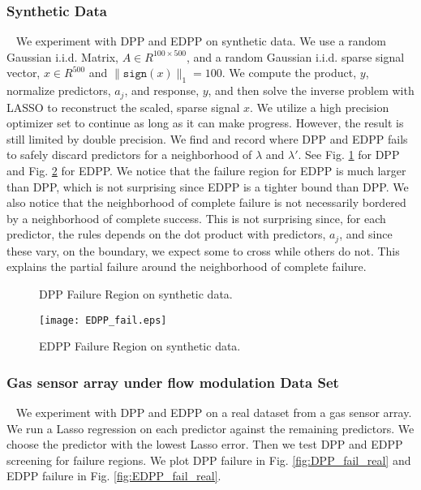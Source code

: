 \documentclass{article}
\begin{document}
\subsubsection*{Synthetic Data}

\qquad ~ We experiment with DPP and EDPP on synthetic data. We use a random Gaussian i.i.d. Matrix, $A\in R^{100 \times 500}$, and a random Gaussian i.i.d. sparse signal vector, $x\in R^{500}$ and $\|\texttt{sign}(x)\|_1=100$. We compute the product, $y$, normalize predictors, $a_j$, and response, $y$, and then solve the inverse problem with LASSO to reconstruct the scaled, sparse signal $x$. We utilize a high precision optimizer set to continue as long as it can make progress. However, the result is still limited by double precision. We find and record where DPP and EDPP fails to safely discard predictors for a neighborhood of $\lambda$ and $\lambda'$. See Fig. \ref{fig:DPP_fail} for DPP and Fig. \ref{fig:EDPP_fail} for EDPP. We notice that the failure region for EDPP is much larger than DPP, which is not surprising since EDPP is a tighter bound than DPP. We also notice that the neighborhood of complete failure is not necessarily bordered by a neighborhood of complete success. This is not surprising since, for each predictor, the rules depends on the dot product with predictors, $a_j$, and since these vary, on the boundary, we expect some to cross while others do not. This explains the partial failure around the neighborhood of complete failure. 

\begin{figure}
    \centering
    \qquad
    \caption{DPP Failure Region on synthetic data.}
	\label{fig:DPP_fail}
\end{figure}

\begin{figure}
    \centering
    {\texttt{[image: EDPP\_fail.eps]} }
    \caption{EDPP Failure Region on synthetic data.}
	\label{fig:EDPP_fail}
\end{figure}


\subsubsection*{Gas sensor array under flow modulation Data Set}

\qquad ~ We experiment with DPP and EDPP on a real dataset from a gas sensor array. We run a Lasso regression on each predictor against the remaining predictors. We choose the predictor with the lowest Lasso error. Then we test DPP and \cite{ddp} EDPP screening for failure regions. We plot DPP failure in Fig. \ref{fig:DPP_fail_real} and EDPP failure in Fig. \ref{fig:EDPP_fail_real}.
\end{document}
